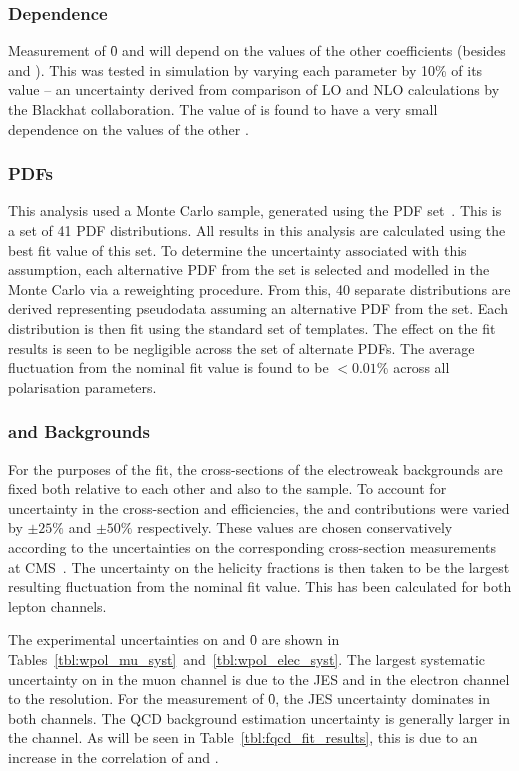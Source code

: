 \subsubsection{\Ai Dependence}
Measurement of \f0 and \fLmfR will depend on the values of the other \Ai
coefficients (besides \Azero and \Afour). This was tested in simulation by
varying each parameter \Ai by 10\% of its value -- an uncertainty derived from
comparison of \ac{LO} and \ac{NLO} calculations by the Blackhat
collaboration. The value of \fLmfR is found to have a very small dependence on
the values of the other \Ai.

\subsubsection{\aclp{PDF}}
\label{sec:wpol_syst_pdf}
This analysis used a \Wjets Monte Carlo sample, generated using the \cteqsixlone
\ac{PDF} set~\cite{cteq6l1}. This is a set of 41 \ac{PDF} distributions. All
results in this analysis are calculated using the best fit value of this set. To
determine the uncertainty associated with this assumption, each alternative
\ac{PDF} from the set is selected and modelled in the Monte Carlo via a
reweighting procedure. From this, 40 separate \LP distributions are derived
representing pseudodata assuming an alternative \ac{PDF} from the set. Each
distribution is then fit using the standard set of templates. The effect on the
fit results is seen to be negligible across the set of alternate \acp{PDF}. The
average fluctuation from the nominal fit value is found to be $< 0.01\%$ across
all polarisation parameters.

\subsubsection{\Zjets and \ttbar Backgrounds}
For the purposes of the fit, the cross-sections of the electroweak backgrounds
are fixed both relative to each other and also to the \Wjets sample. To account
for uncertainty in the cross-section and efficiencies, the \Zjets and \ttbar
contributions were varied by $\pm 25\%$ and $\pm 50\%$ respectively. These
values are chosen conservatively according to the uncertainties on the
corresponding cross-section measurements at
\ac{CMS}~\cite{cms_wz_pas,cms_ttbar_paper}. The uncertainty on the helicity
fractions is then taken to be the largest resulting fluctuation from the nominal
fit value. This has been calculated for both lepton channels.

The experimental uncertainties on \fLmfR and \f0 are shown in
Tables~\ref{tbl:wpol_mu_syst}~and~\ref{tbl:wpol_elec_syst}. The largest
systematic uncertainty on \fLmfR in the muon channel is due to the \ac{JES} and
in the electron channel to the \MET resolution. For the measurement of \f0, the
\ac{JES} uncertainty dominates in both channels. The \ac{QCD} background
estimation uncertainty is generally larger in the \PWm channel. As will be seen
in Table~\ref{tbl:fqcd_fit_results}, this is due to an increase in the
correlation of \fLmfR and \fQCD.

